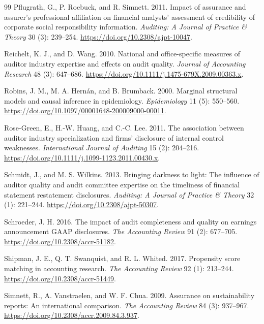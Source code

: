 \documentclass[11pt]{article}
\begin{document}
\begin{thebibliography}{99}
Pflugrath, G., P. Roebuck, and R. Simnett. 2011.
Impact of assurance and assurer's professional affiliation on financial analysts' assessment of credibility of corporate social responsibility information.
\textit{Auditing: A Journal of Practice \& Theory} 30 (3): 239--254. \url{https://doi.org/10.2308/ajpt-10047}.

Reichelt, K. J., and D. Wang. 2010.
National and office-specific measures of auditor industry expertise and effects on audit quality.
\textit{Journal of Accounting Research} 48 (3): 647--686. \url{https://doi.org/10.1111/j.1475-679X.2009.00363.x}.

Robins, J. M., M. A. Hern\'an, and B. Brumback. 2000.
Marginal structural models and causal inference in epidemiology.
\textit{Epidemiology} 11 (5): 550--560. \url{https://doi.org/10.1097/00001648-200009000-00011}.

Rose-Green, E., H.-W. Huang, and C.-C. Lee. 2011.
The association between auditor industry specialization and firms' disclosure of internal control weaknesses.
\textit{International Journal of Auditing} 15 (2): 204--216. \url{https://doi.org/10.1111/j.1099-1123.2011.00430.x}.

Schmidt, J., and M. S. Wilkins. 2013.
Bringing darkness to light: The influence of auditor quality and audit committee expertise on the timeliness of financial statement restatement disclosures.
\textit{Auditing: A Journal of Practice \& Theory} 32 (1): 221--244. \url{https://doi.org/10.2308/ajpt-50307}.

Schroeder, J. H. 2016.
The impact of audit completeness and quality on earnings announcement GAAP disclosures.
\textit{The Accounting Review} 91 (2): 677--705. \url{https://doi.org/10.2308/accr-51182}.

Shipman, J. E., Q. T. Swanquist, and R. L. Whited. 2017.
Propensity score matching in accounting research.
\textit{The Accounting Review} 92 (1): 213--244. \url{https://doi.org/10.2308/accr-51449}.

Simnett, R., A. Vanstraelen, and W. F. Chua. 2009.
Assurance on sustainability reports: An international comparison.
\textit{The Accounting Review} 84 (3): 937--967. \url{https://doi.org/10.2308/accr.2009.84.3.937}.


\end{thebibliography}
\end{document}
